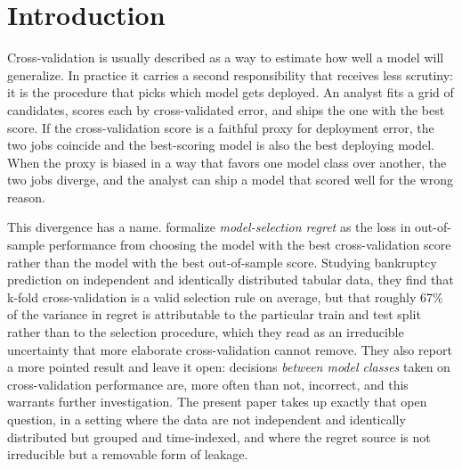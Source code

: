 \documentclass[forecasting,article,submit,oneauthor,pdftex]{Definitions/mdpi}
\begin{document}
\maketitle

\section{Introduction}

Cross-validation is usually described as a way to estimate how well a model will
generalize. In practice it carries a second responsibility that receives less
scrutiny: it is the procedure that picks which model gets deployed. An analyst
fits a grid of candidates, scores each by cross-validated error, and ships the
one with the best score. If the cross-validation score is a faithful proxy for
deployment error, the two jobs coincide and the best-scoring model is also the
best deploying model. When the proxy is biased in a way that favors one model
class over another, the two jobs diverge, and the analyst can ship a model that
scored well for the wrong reason.

This divergence has a name. \citet{teodorescu2025regret} formalize
\emph{model-selection regret} as the loss in out-of-sample performance from
choosing the model with the best cross-validation score rather than the model
with the best out-of-sample score. Studying bankruptcy prediction on independent
and identically distributed tabular data, they find that k-fold cross-validation
is a valid selection rule on average, but that roughly 67\% of the variance in
regret is attributable to the particular train and test split rather than to the
selection procedure, which they read as an irreducible uncertainty that more
elaborate cross-validation cannot remove. They also report a more pointed result
and leave it open: decisions \emph{between model classes} taken on
cross-validation performance are, more often than not, incorrect, and this
warrants further investigation. The present paper takes up exactly that open
question, in a setting where the data are not independent and identically
distributed but grouped and time-indexed, and where the regret source is not
irreducible but a removable form of leakage.
\end{document}
